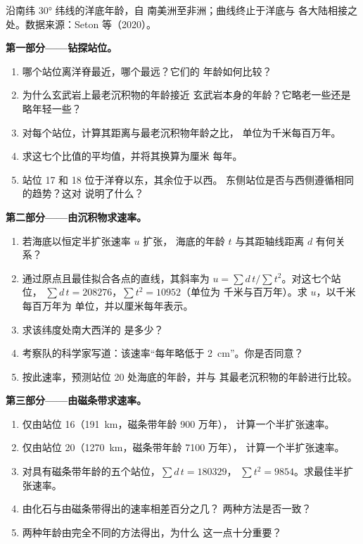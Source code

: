 \begin{problem}
\begin{center}
{\small 沿南纬 \ang{30} 纬线的洋底年龄，自
南美洲至非洲；曲线终止于洋底与
各大陆相接之处。数据来源：Seton 等（2020）。}
\end{center}

\medskip
\noindent\textbf{第一部分——钻探站位。}
\begin{enumerate}
  \item 哪个站位离洋脊最近，哪个最远？它们的
        年龄如何比较？
  \item 为什么玄武岩上最老沉积物的年龄接近
        玄武岩本身的年龄？它略老一些还是
        略年轻一些？
  \item 对每个站位，计算其距离与最老沉积物年龄之比，
        单位为千米每百万年。
  \item 求这七个比值的平均值，并将其换算为厘米
        每年。
  \item 站位 17 和 18 位于洋脊以东，其余位于以西。
        东侧站位是否与西侧遵循相同的趋势？这对
        说明了什么？
\end{enumerate}

\medskip
\noindent\textbf{第二部分——由沉积物求速率。}
\begin{enumerate}[resume]
  \item 若海底以恒定半扩张速率 $u$ 扩张，
        海底的年龄 $t$ 与其距轴线距离 $d$ 有何关系？
  \item 通过原点且最佳拟合各点的直线，其斜率为
        $u = \sum d\,t / \sum t^2$。对这七个站位，
        $\sum d\,t = \num{208276}$，$\sum t^2 = \num{10952}$（单位为
        千米与百万年）。求 $u$，以千米每百万年为
        单位，并以厘米每年表示。
  \item 求该纬度处南大西洋的
        是多少？
  \item 考察队的科学家写道：该速率“每年略低于
        \qty{2}{cm}”。你是否同意？
  \item 按此速率，预测站位 20 处海底的年龄，并与
        其最老沉积物的年龄进行比较。
\end{enumerate}

\medskip
\noindent\textbf{第三部分——由磁条带求速率。}
\begin{enumerate}[resume]
  \item 仅由站位 16（\qty{191}{km}，磁条带年龄 900 万年），
        计算一个半扩张速率。
  \item 仅由站位 20（\qty{1270}{km}，磁条带年龄 7100 万年），
        计算一个半扩张速率。
  \item 对具有磁条带年龄的五个站位，$\sum d\,t = \num{180329}$，
        $\sum t^2 = \num{9854}$。求最佳半扩张速率。
  \item 由化石与由磁条带得出的速率相差百分之几？
        两种方法是否一致？
  \item 两种年龄由完全不同的方法得出，为什么
        这一点十分重要？
\end{enumerate}


\end{problem}

